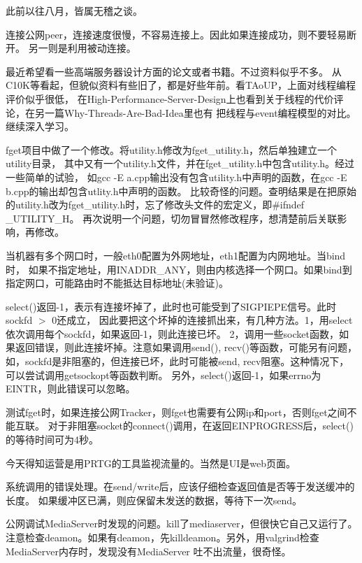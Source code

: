  此前以往八月，皆属无稽之谈。

 连接公网peer，连接速度很慢，不容易连接上。因此如果连接成功，则不要轻易断开。
另一则是利用被动连接。

 最近希望看一些高端服务器设计方面的论文或者书籍。不过资料似乎不多。
从C10K等看起，但貌似资料有些旧了，都是好些年前。看TAoUP，上面对线程编程评价似乎很低，
在High-Performance-Server-Design上也看到关于线程的代价评论，在另一篇Why-Threads-Are-Bad-Idea里也有
把线程与event编程模型的对比。继续深入学习。

 fget项目中做了一个修改。将utility.h修改为fget\_utility.h，然后单独建立一个utility目录，
其中又有一个utility.h文件，并在fget\_utility.h中包含utility.h。经过一些简单的试验，
如gcc -E a.cpp输出没有包含utility.h中声明的函数，在gcc -E b.cpp的输出却包含utlity.h中声明的函数。
比较奇怪的问题。查明结果是在把原始的utility.h改为fget\_utility.h时，忘了修改头文件的宏定义，即\#ifndef \_UTILITY\_H。
再次说明一个问题，切勿冒冒然修改程序，想清楚前后关联影响，再修改。

 当机器有多个网口时，一般eth0配置为外网地址，eth1配置为内网地址。当bind时，
如果不指定地址，用INADDR\_ANY，则由内核选择一个网口。如果bind到指定网口，可能路由时不能抵达目标地址(未验证)。

 select()返回-1，表示有连接坏掉了，此时也可能受到了SIGPIEPE信号。此时sockfd $>$ 0还成立，
因此要把这个坏掉的连接抓出来，有几种方法。1，用select依次调用每个sockfd，如果返回-1，则此连接已坏。
2，调用一些socket函数，如果返回错误，则此连接坏掉。注意如果调用send(), recv()等函数，可能另有问题，
如，sockfd是非阻塞的，但连接已坏，此时可能被send, recv阻塞。这种情况下，可以尝试调用getsockopt等函数判断。
另外，select()返回-1，如果errno为EINTR，则此错误可以忽略。

 测试fget时，如果连接公网Tracker，则fget也需要有公网ip和port，否则fget之间不能互联。
对于非阻塞socket的connect()调用，在返回EINPROGRESS后，select()的等待时间可为4秒。

 今天得知运营是用PRTG的工具监视流量的。当然是UI是web页面。

 系统调用的错误处理。在send/write后，应该仔细检查返回值是否等于发送缓冲的长度。
如果缓冲区已满，则应保留未发送的数据，等待下一次send。

 公网调试MediaServer时发现的问题。kill了mediaserver，但很快它自己又运行了。
注意检查deamon。如果有deamon，先killdeamon。另外，用valgrind检查MediaServer内存时，发现没有MediaServer
吐不出流量，很奇怪。

